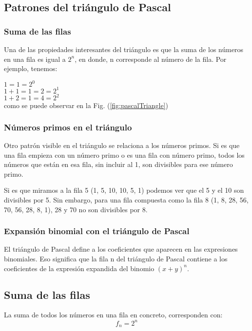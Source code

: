 \subsection{Patrones del triángulo de Pascal}

\subsubsection{Suma de las filas}

Una de las propiedades interesantes del triángulo es que la suma de los números
en una fila es igual a $2^n$, en donde, n corresponde al número de la fila. Por
ejemplo, tenemos:

$ 1 = 1 = 2^0 $ \\
$ 1 + 1 = 1 = 2 = 2^1 $ \\
$ 1 + 2 = 1 = 4 = 2^2 $\\

como se puede observar en la Fig. (\ref{fig:pascalTriangle})

\subsubsection{Números primos en el triángulo}

Otro patrón visible en el triángulo se relaciona a los números primos. Si es que
una fila empieza con un número primo o es una fila con número primo, todos los
números que están en esa fila, sin incluir al 1, son divisibles para ese número
primo.

Si es que miramos a la fila 5 (1, 5, 10, 10, 5, 1) podemos ver que el 5 y el 10
son divisibles por 5. Sin embargo, para una fila compuesta como la fila 8 (1, 8,
28, 56, 70, 56, 28, 8, 1), 28 y 70 no son divisibles por 8.


\subsubsection{Expansión binomial con el triángulo de Pascal}

El triángulo de Pascal define a los coeficientes que aparecen en las expresiones
binomiales. Eso significa que la fila n del triángulo de Pascal contiene a los
coeficientes de la expresión expandida del binomio $(x+y)^n$.


\subsection*{Suma de las filas}
La suma de todos los n\'umeros en una fila en concreto, corresponden con:
		\begin{equation}
			f_n = 2^n
		\end{equation}

